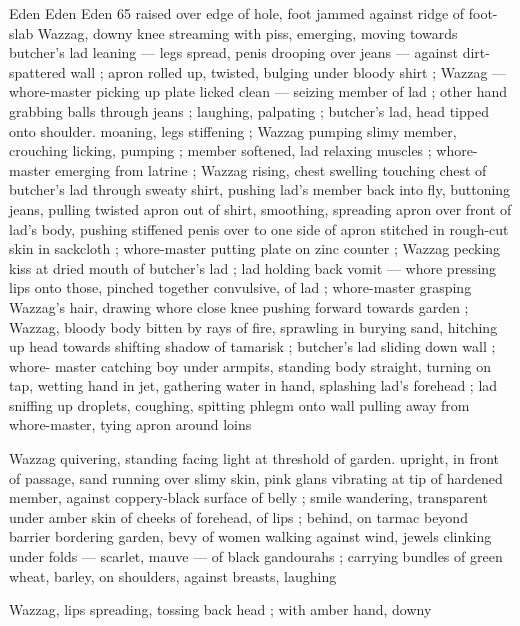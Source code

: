 Eden Eden Eden 65
raised over edge of hole, foot jammed against ridge of foot-slab
Wazzag, downy knee streaming with piss, emerging, moving towards
butcher's lad leaning — legs spread, penis drooping over jeans —
against dirt-spattered wall ; apron rolled up, twisted, bulging under
bloody shirt ; Wazzag — whore-master picking up plate licked clean
— seizing member of lad ; other hand grabbing balls through jeans
; laughing, palpating ; butcher's lad, head tipped onto shoulder.
moaning, legs stiffening ; Wazzag pumping slimy member, crouching
licking, pumping ; member softened, lad relaxing muscles ; whore-
master emerging from latrine ; Wazzag rising, chest swelling
touching chest of butcher's lad through sweaty shirt, pushing lad’s
member back into fly, buttoning jeans, pulling twisted apron out of
shirt, smoothing, spreading apron over front of lad’s body, pushing
stiffened penis over to one side of apron stitched in rough-cut skin
in sackcloth ; whore-master putting plate on zinc counter ; Wazzag
pecking kiss at dried mouth of butcher's lad ; lad holding back vomit
— whore pressing lips onto those, pinched together convulsive, of
lad ; whore-master grasping Wazzag's hair, drawing whore close
knee pushing forward towards garden ; Wazzag, bloody body bitten
by rays of fire, sprawling in burying sand, hitching up head towards
shifting shadow of tamarisk ; butcher's lad sliding down wall ; whore-
master catching boy under armpits, standing body straight, turning
on tap, wetting hand in jet, gathering water in hand, splashing lad's
forehead ; lad sniffing up droplets, coughing, spitting phlegm onto
wall pulling away from whore-master, tying apron around loins

Wazzag quivering, standing facing light at threshold of garden.
upright, in front of passage, sand running over slimy skin, pink glans
vibrating at tip of hardened member, against coppery-black surface
of belly ; smile wandering, transparent under amber skin of cheeks
of forehead, of lips ; behind, on tarmac beyond barrier bordering
garden, bevy of women walking against wind, jewels clinking under
folds — scarlet, mauve — of black gandourahs ; carrying bundles
of green wheat, barley, on shoulders, against breasts, laughing

Wazzag, lips spreading, tossing back head ; with amber hand, downy

